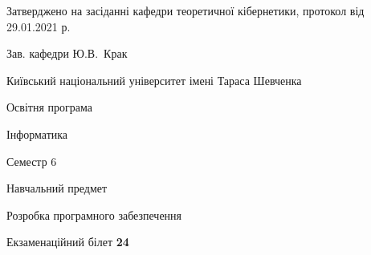\documentclass[10pt, ukrainian]{article}
\begin{document}
{\vspace{5mm}\smallskip \begin {small} Затверджено на засіданні кафедри теоретичної кібернетики, протокол  від   29.01.2021 р.\par\smallskip\smallskip
{\parbox {6.5 cm}{Зав. кафедри \dotfill Ю.В.~Крак}} \end{small}}
\newpage

{{\begin {small}\par
{ \center  Київський національний університет імені Тараса Шевченка \par}
{\parbox {5 cm}{Освітня програма \hfill}{\parbox {7 cm}{Інформатика \hfill}}\parbox {6 cm}{\hfill Семестр 6}}\par
{\parbox {5 cm} {Навчальний предмет \hfill}\parbox {7 cm}{Розробка програмного забезпечення \hfill}\parbox {6cm}{\hfill}\par}\vspace{-7pt} \end{small}}{\center Екзаменаційний білет \No \textbf
{ 24 }\par}}
\end{document}
